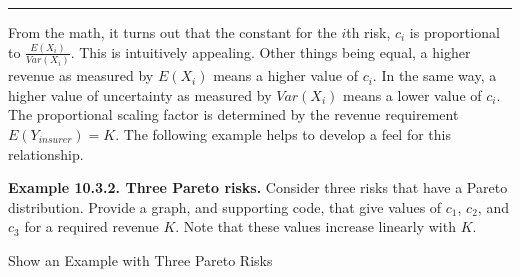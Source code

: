 \documentclass[]{book}
\theoremstyle{definition}
\theoremstyle{definition}
\theoremstyle{definition}
\theoremstyle{remark}
\begin{document}
\begin{center}\rule{0.5\linewidth}{\linethickness}\end{center}

From the math, it turns out that the constant for the \(i\)th risk,
\(c_i\) is proportional to \(\frac{E(X_i)}{Var (X_i)}\). This is
intuitively appealing. Other things being equal, a higher revenue as
measured by \(E (X_i)\) means a higher value of \(c_i\). In the same
way, a higher value of uncertainty as measured by \(Var(X_i)\) means a
lower value of \(c_i\). The proportional scaling factor is determined by
the revenue requirement \(E(Y_{insurer}) = K\). The following example
helps to develop a feel for this relationship.

\textbf{Example 10.3.2. Three Pareto risks.} Consider three risks that
have a Pareto distribution. Provide a graph, and supporting code, that
give values of \(c_1\), \(c_2\), and \(c_3\) for a required revenue
\(K\). Note that these values increase linearly with \(K\).

Show an Example with Three Pareto Risks
\end{document}
